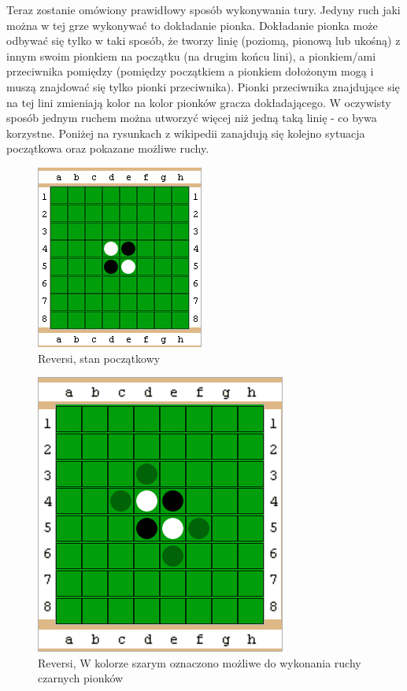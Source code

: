 \documentclass[polish,shortabstract,inz]{iithesis}
\begin{document}
Teraz zostanie omówiony prawidłowy sposób wykonywania tury.
Jedyny ruch jaki można w tej grze wykonywać to dokładanie pionka.
Dokładanie pionka może odbywać się tylko w taki sposób, że tworzy linię (poziomą, pionową lub ukośną) z innym swoim pionkiem na początku (na drugim końcu lini), a pionkiem/ami przeciwnika pomiędzy (pomiędzy początkiem a pionkiem dołożonym mogą i muszą znajdować się tylko pionki przeciwnika).
Pionki przeciwnika znajdujące się na tej lini zmieniają kolor na kolor pionków gracza dokładającego.
W oczywisty sposób jednym ruchem można utworzyć więcej niż jedną taką linię - co bywa korzystne.
Poniżej na rysunkach z wikipedii zanajdują się kolejno sytuacja początkowa oraz pokazane możliwe ruchy.
\begin{figure}[H]
  \includegraphics{./images/reversi.png}
  \centering
  \caption{Reversi, stan początkowy}
  \label{fig:reversi}
\end{figure}

\begin{figure}[H]
  \includegraphics[scale=0.66]{./images/reversi_moves.png}
  \centering
  \caption{Reversi, W kolorze szarym oznaczono możliwe do wykonania ruchy czarnych pionków}
  \label{fig:reversi_moves}
\end{figure}
\end{document}
